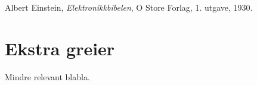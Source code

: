 \documentclass[a4paper,11pt,norsk]{article}
\begin{document}
{}
\begin{thebibliography}{99}

  Albert Einstein,
  \emph{Elektronikkbibelen},
  O Store Forlag,
  1. utgave,
  1930.

\end{thebibliography}

\appendix
\section{Ekstra greier}
Mindre relevant blabla.
\end{document}

